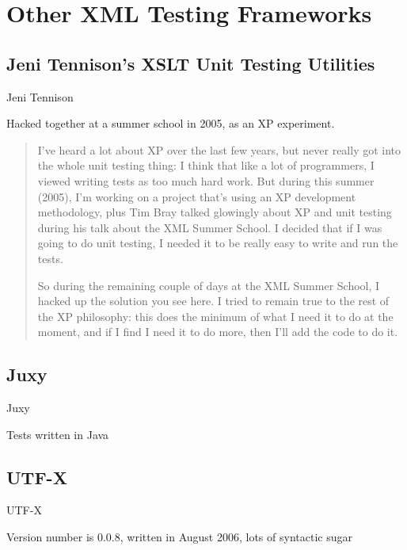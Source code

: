 %

\chapter{Other XML Testing Frameworks}

\section{Jeni Tennison's XSLT Unit Testing Utilities}

Jeni Tennison

Hacked together at a summer school in 2005, as an XP experiment.

\begin{quotation}
I've heard a lot about XP over the last few years, but never really got into the whole unit testing thing: I think that like a lot of programmers, I viewed writing tests as too much hard work. But during this summer (2005), I'm working on a project that's using an XP development methodology, plus Tim Bray talked glowingly about XP and unit testing during his talk about the XML Summer School. I decided that if I was going to do unit testing, I needed it to be really easy to write and run the tests.

So during the remaining couple of days at the XML Summer School, I hacked up the solution you see here. I tried to remain true to the rest of the XP philosophy: this does the minimum of what I need it to do at the moment, and if I find I need it to do more, then I'll add the code to do it.
\end{quotation}

\section{Juxy}

Juxy

Tests written in Java

\section{UTF-X}

UTF-X

Version number is 0.0.8, written in August 2006, lots of syntactic sugar

